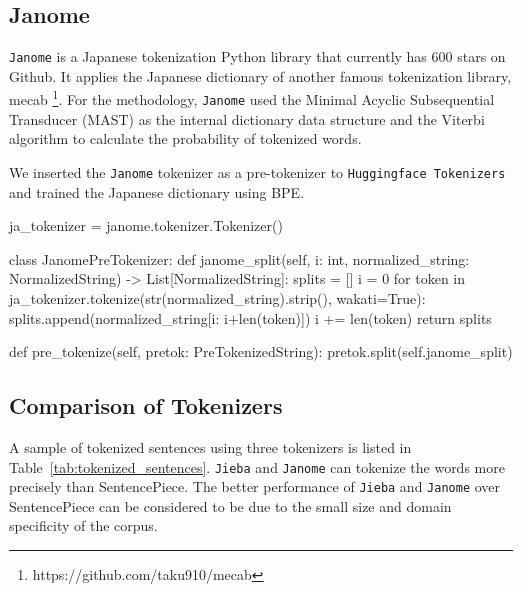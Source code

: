 \newpage

\subsection{Janome} \label{sec:janome}

\texttt{Janome} is a Japanese tokenization Python library that currently has 600 stars on Github. It applies the Japanese dictionary of another famous tokenization library, mecab \footnote{https://github.com/taku910/mecab}. For the methodology, \texttt{Janome} used the Minimal Acyclic Subsequential Transducer (MAST) as the internal dictionary data structure and the Viterbi algorithm to calculate the probability of tokenized words.

We inserted the \texttt{Janome} tokenizer as a pre-tokenizer to \texttt{Huggingface Tokenizers} and trained the Japanese dictionary using BPE.

\vspace{0.3cm}

\begin{python}
ja_tokenizer = janome.tokenizer.Tokenizer()

class JanomePreTokenizer:
    def janome_split(self, i: int, normalized_string: NormalizedString) -> List[NormalizedString]:
        splits = []
        i = 0
        for token in ja_tokenizer.tokenize(str(normalized_string).strip(), wakati=True):
            splits.append(normalized_string[i: i+len(token)])
            i += len(token)
        return splits
    
    def pre_tokenize(self, pretok: PreTokenizedString):
        pretok.split(self.janome_split)

\end{python}

\subsection{Comparison of Tokenizers} \label{sec:compare_tokenizers}

A sample of tokenized sentences using three tokenizers is listed in Table~\ref{tab:tokenized_sentences}. \texttt{Jieba} and \texttt{Janome} can tokenize the words more precisely than SentencePiece. The better performance of \texttt{Jieba} and \texttt{Janome} over SentencePiece can be considered to be due to the small size and domain specificity of the corpus.

